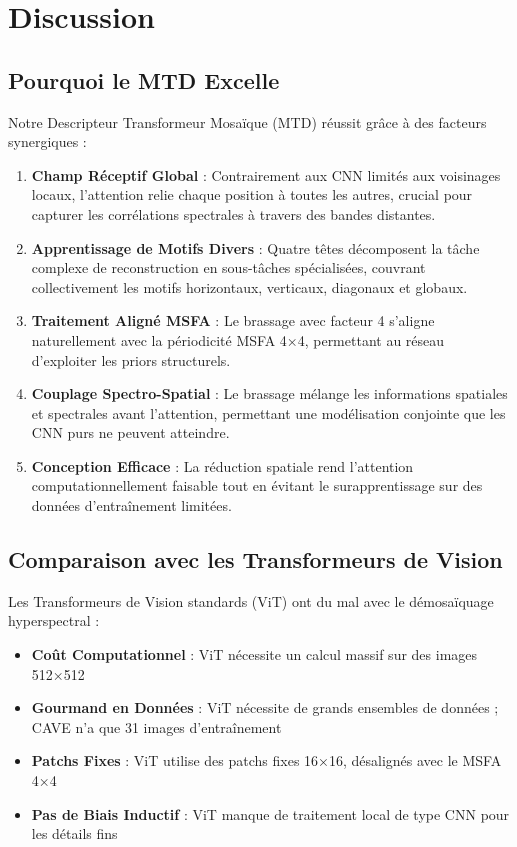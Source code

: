 \documentclass[conference]{IEEEtran}
\begin{document}
\section{Discussion}

\subsection{Pourquoi le MTD Excelle}

Notre Descripteur Transformeur Mosaïque (MTD) réussit grâce à des facteurs synergiques :

\begin{enumerate}
    \item \textbf{Champ Réceptif Global} : Contrairement aux CNN limités aux voisinages locaux, l'attention relie chaque position à toutes les autres, crucial pour capturer les corrélations spectrales à travers des bandes distantes.
    
    \item \textbf{Apprentissage de Motifs Divers} : Quatre têtes décomposent la tâche complexe de reconstruction en sous-tâches spécialisées, couvrant collectivement les motifs horizontaux, verticaux, diagonaux et globaux.
    
    \item \textbf{Traitement Aligné MSFA} : Le brassage avec facteur 4 s'aligne naturellement avec la périodicité MSFA 4×4, permettant au réseau d'exploiter les priors structurels.
    
    \item \textbf{Couplage Spectro-Spatial} : Le brassage mélange les informations spatiales et spectrales avant l'attention, permettant une modélisation conjointe que les CNN purs ne peuvent atteindre.
    
    \item \textbf{Conception Efficace} : La réduction spatiale rend l'attention computationnellement faisable tout en évitant le surapprentissage sur des données d'entraînement limitées.
\end{enumerate}

\subsection{Comparaison avec les Transformeurs de Vision}

Les Transformeurs de Vision standards (ViT) \cite{b6} ont du mal avec le démosaïquage hyperspectral :

\begin{itemize}
    \item \textbf{Coût Computationnel} : ViT nécessite un calcul massif sur des images 512×512
    \item \textbf{Gourmand en Données} : ViT nécessite de grands ensembles de données ; CAVE n'a que 31 images d'entraînement
    \item \textbf{Patchs Fixes} : ViT utilise des patchs fixes 16×16, désalignés avec le MSFA 4×4
    \item \textbf{Pas de Biais Inductif} : ViT manque de traitement local de type CNN pour les détails fins
\end{itemize}
\end{document}
